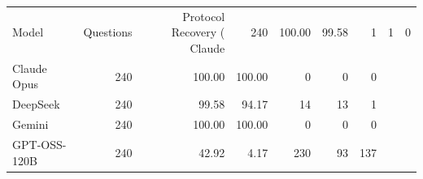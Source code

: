 \begin{tabular}{lrrrrrr}
\toprule
Model & Questions & Protocol Recovery (%
\midrule
Claude & 240 & 100.00 & 99.58 & 1 & 1 & 0 \\
Claude Opus & 240 & 100.00 & 100.00 & 0 & 0 & 0 \\
DeepSeek & 240 & 99.58 & 94.17 & 14 & 13 & 1 \\
Gemini & 240 & 100.00 & 100.00 & 0 & 0 & 0 \\
GPT-OSS-120B & 240 & 42.92 & 4.17 & 230 & 93 & 137 \\
\bottomrule
\end{tabular}
